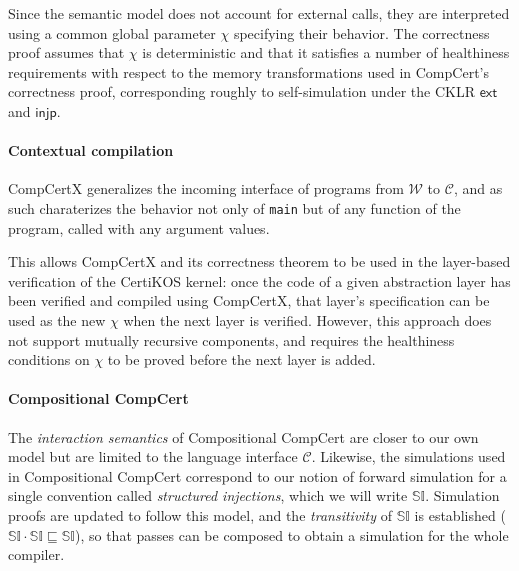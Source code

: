\documentclass[acmsmall,authordraft]{acmart}
\newcommand{\kw}[1]{\ensuremath{ \mathsf{#1} }}
\newcommand{\scref}{\sqsubseteq}
\begin{document}
Since the semantic model does not account
for external calls,
they are interpreted %
using a common global parameter $\chi$
specifying their behavior.
The correctness proof assumes that $\chi$ is deterministic
and that it satisfies a number of healthiness requirements
with respect to the memory transformations
used in CompCert's correctness proof,
corresponding roughly to self-simulation
under the CKLR $\kw{ext}$ and $\kw{injp}$.


\paragraph{Contextual compilation} %

CompCertX \cite{popl15} generalizes
the incoming interface of programs
from $\mathcal{W}$ to $\mathcal{C}$,
and as such charaterizes the behavior
not only of \texttt{main}
but of any function of the program,
called with any argument values.

This allows CompCertX and its correctness theorem
to be used in the layer-based verification of
the CertiKOS kernel:
once the code of a given abstraction layer has been verified
and compiled using CompCertX,
that layer's specification can be used as the new $\chi$
when the next layer is verified.
However,
this approach does not support
mutually recursive components,
and requires the healthiness conditions on $\chi$
to be proved before the next layer is added.


\paragraph{Compositional CompCert} %

The \emph{interaction semantics} of
Compositional CompCert \cite{compcompcert}
are closer to our own model
but are limited to the language interface $\mathcal{C}$.
Likewise, the simulations used in Compositional CompCert
correspond to our notion of forward simulation
for a single convention called \emph{structured injections},
which we will write $\mathbb{SI}$.
Simulation proofs are updated to follow this model,
and the \emph{transitivity} of $\mathbb{SI}$ is established
($\mathbb{SI} \cdot \mathbb{SI} \scref \mathbb{SI}$),
so that passes can be composed
to obtain a simulation for the whole compiler.
\end{document}
